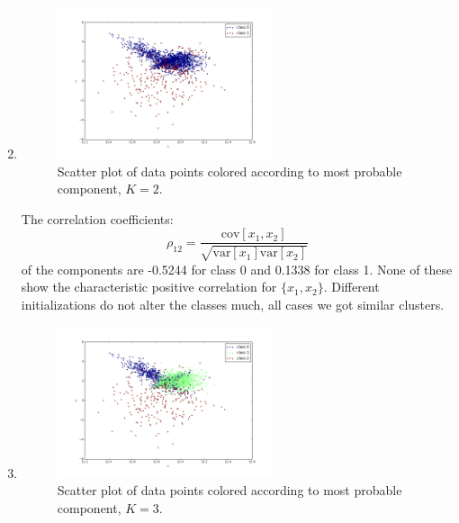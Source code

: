 \documentclass[a4paper,10pt]{article}
\numberwithin{equation}{section} %
\numberwithin{figure}{section} %
\numberwithin{table}{section} %
\theoremstyle{mytheor}
\begin{document}
\begin{enumerate}
\begin{enumerate}
\begin{equation*}
				\end{equation*}
		\end{enumerate}
	\item \begin{figure}[h!]
   			\centering
   			\includegraphics[width=0.6\textwidth]{ex3plots/class_2_100.png}\vspace{-0.6cm}
   			\caption{\vspace{-0.1cm} Scatter plot of data points colored according to most probable component, $K = 2$.}\vspace{-0.2cm}
  		\end{figure}
		The correlation coefficients:
		\begin{equation*}
			\rho_{12} = \frac{\text{cov}[x_1,x_2]}{\sqrt{\text{var}[x_1]\text{var}[x_2]}}
		\end{equation*}
		of the components are -0.5244 for class 0 and 0.1338 for class 1. None of these show the characteristic positive correlation for $\{x_1,x_2\}$. Different initializations do not alter the classes much, all cases we got similar clusters.
	\item \begin{figure}[h!]
   			\centering
   			\includegraphics[width=0.6\textwidth]{ex3plots/class_3_100.png}\vspace{-0.6cm}
   			\caption{\vspace{-0.1cm} Scatter plot of data points colored according to most probable component, $K = 3$.}\vspace{-0.2cm}

\end{figure}
\end{enumerate}
\end{document}
